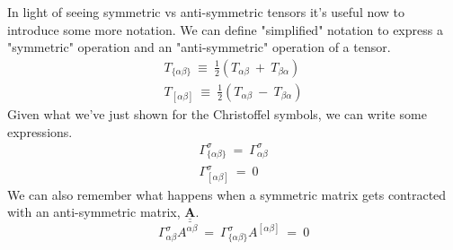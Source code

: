 \hskip 25pt In light of seeing symmetric vs anti-symmetric tensors it's useful now to introduce some more notation.  We
can define "simplified" notation to express a "symmetric" operation and an "anti-symmetric" operation of a tensor.
\begin{gather}
  T_{\{\alpha\beta\}}\ \equiv\ \frac{1}{2}\left (T_{\alpha\beta}\ +\ T_{\beta\alpha}\right ) \\
  T_{[\alpha\beta]}\ \equiv\ \frac{1}{2}\left (T_{\alpha\beta}\ -\ T_{\beta\alpha}\right )
\end{gather}
Given what we've just shown for the Christoffel symbols, we can write some expressions.
\begin{gather}
  \Gamma^{\sigma}_{\{\alpha\beta\}}\ =\ \Gamma^{\sigma}_{\alpha\beta} \\
  \Gamma^{\sigma}_{[\alpha\beta]}\ =\ 0
\end{gather}
We can also remember what happens when a symmetric matrix gets contracted with an anti-symmetric matrix,
$\underline{\underline{\mathbf{A}}}$.
\begin{equation}
  \Gamma^{\sigma}_{\alpha\beta}A^{\alpha\beta}\ =\
  \Gamma^{\sigma}_{\{\alpha\beta\}}A^{[\alpha\beta]}\ =\ 0
\end{equation}

